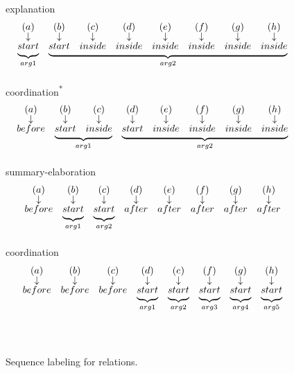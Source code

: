 \begin{figure}[ht]
\centering

explanation
\[
\begin{array}{*8{c}}
(a)&(b)&(c)&(d)&(e)&(f)&(g)&(h)\\[-2pt]
\downarrow&\downarrow&\downarrow&\downarrow&\downarrow&\downarrow&\downarrow&\downarrow\\[-2pt]
\undermat{arg1}{start}&\undermat{arg2}{start&inside&inside&inside&inside&inside&inside}
\end{array}
\]

coordination\textsuperscript{*}
\[
\begin{array}{*8{c}}
(a)&(b)&(c)&(d)&(e)&(f)&(g)&(h)\\[-2pt]
\downarrow&\downarrow&\downarrow&\downarrow&\downarrow&\downarrow&\downarrow&\downarrow\\[-2pt]
before&\undermat{arg1}{start&inside}&\undermat{arg2}{start&inside&inside&inside&inside}
\end{array}
\]

summary-elaboration
\[
\begin{array}{*8{c}}
(a)&(b)&(c)&(d)&(e)&(f)&(g)&(h)\\[-2pt]
\downarrow&\downarrow&\downarrow&\downarrow&\downarrow&\downarrow&\downarrow&\downarrow\\[-2pt]
before&\undermat{arg1}{start}&\undermat{arg2}{start}&after&after&after&after&after
\end{array}
\]

coordination
\[
\begin{array}{*8{c}}
(a)&(b)&(c)&(d)&(e)&(f)&(g)&(h)\\[-2pt]
\downarrow&\downarrow&\downarrow&\downarrow&\downarrow&\downarrow&\downarrow&\downarrow\\[-2pt]
before&before&before&\undermat{arg1}{start}&\undermat{arg2}{start}&\undermat{arg3}{start}&\undermat{arg4}{start}&\undermat{arg5}{start}
\end{array}
\]

\caption{\label{i:rare-args} Sequence labeling for relations. }

\end{figure}
